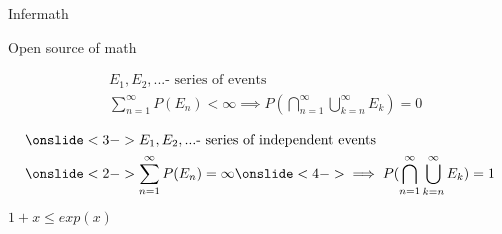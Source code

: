 \documentclass[20pt,xcolor={dvipsnames}]{beamer}
\begin{document}

\begin{frame}[c]

\centering


\vspace{-1cm}

\Huge Infermath

\normalsize Open source of math 

\end{frame}

\begin{frame}

\hspace*{-0.5cm}\vbox{\begin{align*} 
& E_1, E_2, ... \text{- series of events} \\
& \sum_{n=1}^{\infty}P(E_n)<\infty \implies P(\bigcap_{n=1}^{\infty} \bigcup_{k=n}^{\infty} E_k)=0
\end{align*}}


\hspace*{-0.5cm}\vbox{\begin{align*} 
& \onslide<3->{E_1, E_2, ... \text{- series of independent events}}\\
& \onslide<2->{\sum_{n=1}^{\infty}P(E_n)=\infty} 
\onslide<4->{ \implies P(\bigcap_{n=1}^{\infty} \bigcup_{k=n}^{\infty} E_k)=1}\\
\end{align*}}

\end{frame}

\begin{frame}

\centering

$1+x \leq exp(x) $\\

 \\


\end{frame}
\end{document}
